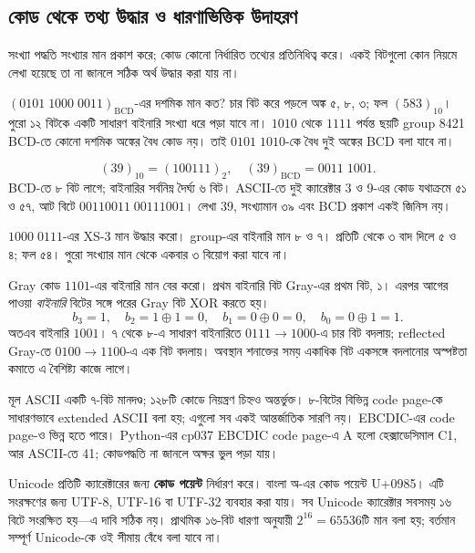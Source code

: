 \subsection{কোড থেকে তথ্য উদ্ধার ও ধারণাভিত্তিক উদাহরণ}
সংখ্যা পদ্ধতি সংখ্যার মান প্রকাশ করে; কোড কোনো নির্ধারিত তথ্যের প্রতিনিধিত্ব করে। একই বিটগুলো কোন নিয়মে লেখা হয়েছে তা না জানলে সঠিক অর্থ উদ্ধার করা যায় না।

$(0101\;1000\;0011)_{\mathrm{BCD}}$-এর দশমিক মান কত?
\chThreeAnswer চার বিট করে পড়লে অঙ্ক ৫, ৮, ৩; ফল $(583)_{10}$। পুরো ১২ বিটকে একটি সাধারণ বাইনারি সংখ্যা ধরে পড়া যাবে না। $1010$ থেকে $1111$ পর্যন্ত ছয়টি group 8421 BCD-তে কোনো দশমিক অঙ্কের বৈধ কোড নয়। তাই $0101\;1010$-কে বৈধ দুই অঙ্কের BCD বলা যাবে না।

\chThreeAnswer
\[(39)_{10}=(100111)_2,\quad(39)_{\mathrm{BCD}}=0011\;1001.\]
BCD-তে ৮ বিট লাগে; বাইনারির সর্বনিম্ন দৈর্ঘ্য ৬ বিট। ASCII-তে দুই ক্যারেক্টার \textenglish{3} ও \textenglish{9}-এর কোড যথাক্রমে ৫১ ও ৫৭, আট বিটে $00110011\;00111001$। লেখা \textenglish{39}, সংখ্যামান ৩৯ এবং BCD প্রকাশ একই জিনিস নয়।

$1000\;0111$-এর XS-3 মান উদ্ধার করো।
\chThreeAnswer group-এর বাইনারি মান ৮ ও ৭। প্রতিটি থেকে ৩ বাদ দিলে ৫ ও ৪; ফল ৫৪। পুরো সংখ্যার মান থেকে একবার ৩ বিয়োগ করা যাবে না।

Gray কোড $1101$-এর বাইনারি মান বের করো।
\chThreeAnswer প্রথম বাইনারি বিট Gray-এর প্রথম বিট, ১। এরপর আগের পাওয়া \emph{বাইনারি} বিটের সঙ্গে পরের Gray বিট XOR করতে হয়।
\[b_3=1,\quad b_2=1\oplus1=0,\quad b_1=0\oplus0=0,\quad b_0=0\oplus1=1.\]
অতএব বাইনারি $1001$। ৭ থেকে ৮-এ সাধারণ বাইনারিতে $0111\to1000$-এ চার বিট বদলায়; reflected Gray-তে $0100\to1100$-এ এক বিট বদলায়। অবস্থান শনাক্তের সময় একাধিক বিট একসঙ্গে বদলানোর অস্পষ্টতা কমাতে এ বৈশিষ্ট্য কাজে লাগে।

মূল ASCII একটি ৭-বিট মানদণ্ড; ১২৮টি কোডে নিয়ন্ত্রণ চিহ্নও অন্তর্ভুক্ত। ৮-বিটের বিভিন্ন code page-কে সাধারণভাবে extended ASCII বলা হয়; এগুলো সব একই আন্তর্জাতিক সারণি নয়। EBCDIC-এর code page-ও ভিন্ন হতে পারে। \textenglish{Python}-এর \textenglish{cp037} EBCDIC code page-এ \textenglish{A} হলো হেক্সাডেসিমাল C1, আর ASCII-তে 41; কোডপদ্ধতি না জানলে অক্ষর ভুল পড়া যায়।

Unicode প্রতিটি ক্যারেক্টারের জন্য \textbf{কোড পয়েন্ট} নির্ধারণ করে। বাংলা অ-এর কোড পয়েন্ট \textenglish{U+0985}। এটি সংরক্ষণের জন্য UTF-8, UTF-16 বা UTF-32 ব্যবহার করা যায়। সব Unicode ক্যারেক্টার সবসময় ১৬ বিটে সংরক্ষিত হয়—এ দাবি সঠিক নয়। প্রাথমিক ১৬-বিট ধারণা অনুযায়ী $2^{16}=65536$টি মান বলা হয়; বর্তমান সম্পূর্ণ Unicode-কে ওই সীমায় বেঁধে বলা যাবে না।

